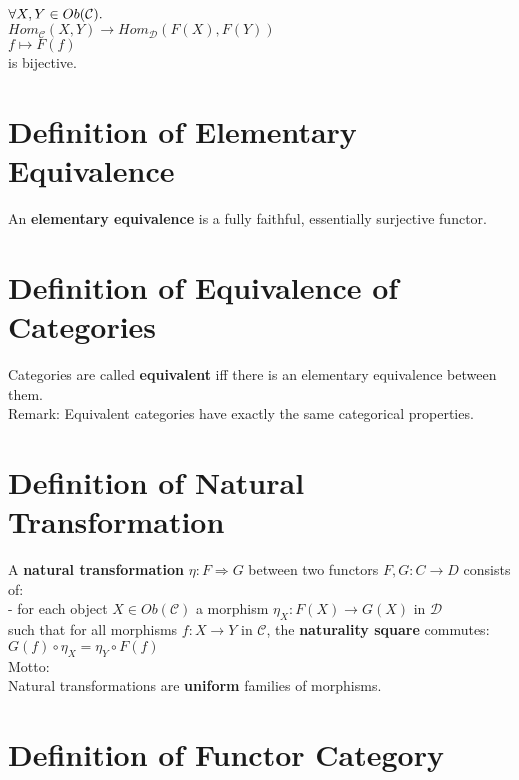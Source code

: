 \documentclass[a4paper, twoside, english, 11pt]{book}
\newcommand{\C}{\mathcal C}
\newcommand{\D}{\mathcal D}
\begin{document}
$\forall X, Y \in Ob(\C) \ldotp$ \\
\indent
$Hom_\C(X, Y) \rightarrow Hom_\D(F(X), F(Y))$ \\
\indent
$f \mapsto F(f)$ \\

\noindent
is bijective.



\section{Definition of Elementary Equivalence}

An \textbf{elementary equivalence} is a fully faithful, essentially surjective functor.



\section{Definition of Equivalence of Categories}

Categories are called \textbf{equivalent} iff there is an elementary equivalence between them. \\

\noindent
Remark:
Equivalent categories have exactly the same categorical properties.



\section{Definition of Natural Transformation}

A \textbf{natural transformation} $\eta : F \Rightarrow G$ between two functors $F, G : C \rightarrow D$ consists of: \\

- for each object $X \in Ob(\C)$ a morphism $\eta_X : F(X) \rightarrow G(X)$ in $\D$ \\

\noindent
such that for all morphisms $f : X \rightarrow Y$ in $\C$, the \textbf{naturality square} commutes: \\

$G(f) \circ \eta_X = \eta_Y \circ F(f)$ \\

\noindent
Motto: \\
Natural transformations are \textbf{uniform} families of morphisms.



\section{Definition of Functor Category}
\end{document}
